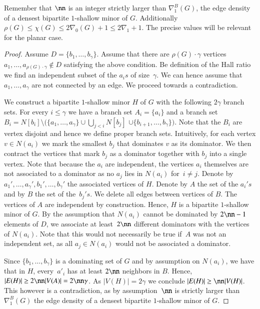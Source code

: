 Remember that $\nn$ is an integer strictly larger than $\nabla_1^B(G)$, the
edge density of a densest bipartite $1$-shallow minor of $G$.
Additionally
$\rho(G)\le\chi(G)\leq 2\nabla_0(G)+1\leq 2\nabla_1+1$. The precise values
will be relevant for the planar case.

\begin{proof}
  Assume $D=\{b_1,\ldots,b_\gamma\}$.  Assume that there are
  $\rho(G)\cdot\gamma$ vertices
  $a_1,\ldots,a_{\rho(G)\cdot\gamma}\not\in D$ satisfying the above
  condition. Be definition of the Hall ratio we
  find an independent subset of the $a_is$ of size~$\gamma$. We can
  hence assume that $a_1,\ldots,a_{\gamma}$ are not connected by an
  edge. We proceed towards a contradiction.

  We construct a bipartite $1$-shallow minor $H$ of $G$ with the
  following \mbox{$2\gamma$} branch sets. For every
  \mbox{$i\le \gamma$} we have a branch set $A_i=\{a_i\}$ and a branch
  set
  $B_i=N[b_i]\setminus \big(\{a_1,\ldots, a_{\gamma}\}\cup
    \bigcup_{j<i}N[b_j]$ $\cup \{b_{i+1},\ldots, b_\gamma\}\big)$. Note that
  the $B_i$ are vertex disjoint and hence we define proper branch
  sets. Intuitively, for each vertex $v\in N(a_i)$ we mark the
  smallest $b_j$ that dominates $v$ as its dominator. We then contract
  the vertices that mark $b_j$ as a dominator together with $b_j$ into
  a single vertex. Note that because the $a_i$ are independent, the
  vertices $a_i$ themselves are not associated to a dominator as no
  $a_j$ lies in $N(a_i)$ for~$i\neq j$.  Denote by
  $a_1',\ldots, a_{\gamma}',b_1',\ldots, b_\gamma'$ the associated
  vertices of $H$. Denote by $A$ the set of the $a_i's$ and by $B$ the
  set of the~$b_j's$.  We delete all edges between vertices of
  $B$. The vertices of $A$ are independent by construction. Hence, $H$
  is a bipartite $1$-shallow minor of $G$.  By the assumption that
  $N(a_i)$ cannot be dominated by $2\nn-1$ elements of $D$, we
  associate at least~$2\nn$ different dominators with the vertices of
  $N(a_i)$. Note that this would not necessarily be true if~$A$ was
  not an independent set, as all $a_j\in N(a_i)$ would not be
  associated a dominator.

  Since $\{b_1,\ldots, b_\gamma\}$ is a dominating set of $G$ and by
  assumption on $N(a_i)$, we have that in $H$, every~$a'_i$ has at
  least $2\nn$ neighbors in $B$. Hence,
  $|E(H)| \ge 2\nn|V(A)| = 2\nn\gamma$. As $|V(H)|=2\gamma$ we
  conclude $|E(H)|\ge \nn|V(H)|$. This however is a contradiction,
  as by assumption~$\nn$ is strictly larger than $\nabla_1^B(G)$ the edge
  density of a densest
  bipartite $1$-shallow minor of $G$.
\end{proof}

